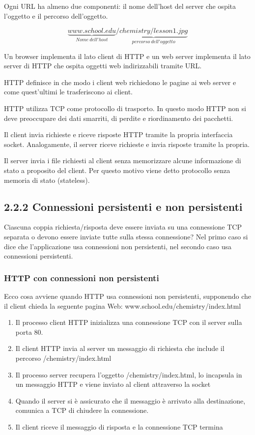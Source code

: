 \documentclass{book}
\begin{document}
Ogni URL ha almeno due componenti: il nome dell'host del server che ospita l'oggetto e il percorso dell'oggetto.

$$\underbrace{www.school.edu}_{Nome\ dell'host} / \underbrace{chemistry/lesson1.jpg}_{percorso\ dell'oggetto}$$

Un browser implementa il lato client di HTTP e un web server implementa il lato server di HTTP che ospita oggetti web indirizzabili tramite URL.

HTTP definisce in che modo i client web richiedono le pagine ai web server e come quest'ultimi le trasferiscono ai client.

HTTP utilizza TCP come protocollo di trasporto. In questo modo HTTP non si deve preoccupare dei dati smarriti, di perdite e riordinamento dei pacchetti.

Il client invia richieste e riceve risposte HTTP tramite la propria interfaccia socket. Analogamente, il server riceve richieste e invia risposte tramite la propria.

Il server invia i file richiesti al client senza memorizzare alcune informazione di stato a proposito del client. Per questo motivo viene detto protocollo senza memoria di stato (stateless).

\subsection*{2.2.2 Connessioni persistenti e non persistenti}
Ciascuna coppia richiesta/risposta deve essere inviata su una connessione TCP separata o devono essere inviate tutte sulla stessa connessione? Nel primo caso si dice che l'applicazione usa connessioni non persistenti, nel secondo caso usa connessioni persistenti.

\subsubsection*{HTTP con connessioni non persistenti}
Ecco cosa avviene quando HTTP usa connessioni non persistenti, supponendo che il client chieda la seguente pagina Web: www.school.edu/chemistry/index.html
\begin{enumerate}
	\item Il processo client HTTP inizializza una connessione TCP con il server sulla porta 80.
	\item Il client HTTP invia al server un messaggio di richiesta che include il percorso /chemistry/index.html
	\item Il processo server recupera l'oggetto /chemistry/index.html, lo incapsula in un messaggio HTTP e viene inviato al client attraverso la socket
	\item Quando il server si è assicurato che il messaggio è arrivato alla destinazione, comunica a TCP di chiudere la connessione.
	\item Il client riceve il messaggio di risposta e la connessione TCP termina
\end{enumerate}
\end{document}
